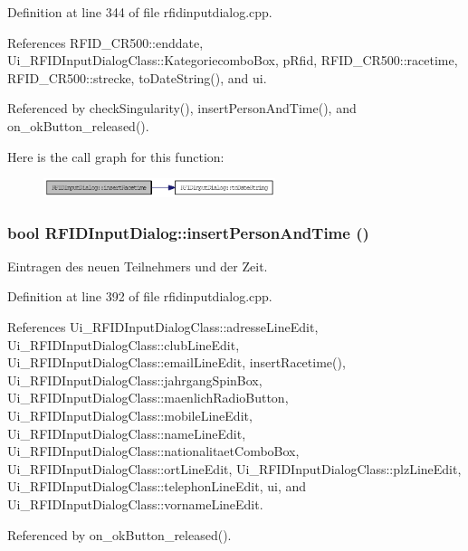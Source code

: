 Definition at line 344 of file rfidinputdialog.cpp.

References RFID\_\-CR500::enddate, Ui\_\-RFIDInputDialogClass::KategoriecomboBox, pRfid, RFID\_\-CR500::racetime, RFID\_\-CR500::strecke, toDateString(), and ui.

Referenced by checkSingularity(), insertPersonAndTime(), and on\_\-okButton\_\-released().

Here is the call graph for this function:\nopagebreak
\begin{figure}[H]
\begin{center}
\leavevmode
\includegraphics[width=192pt]{class_r_f_i_d_input_dialog_3f2a6693dd90d3a2308decf4dcd122dd_cgraph}
\end{center}
\end{figure}
\hypertarget{class_r_f_i_d_input_dialog_5213121582a03ad6c9e78d1915729937}{
\subsubsection[insertPersonAndTime]{\setlength{\rightskip}{0pt plus 5cm}bool RFIDInputDialog::insertPersonAndTime ()}}
\label{class_r_f_i_d_input_dialog_5213121582a03ad6c9e78d1915729937}


Eintragen des neuen Teilnehmers und der Zeit. 



Definition at line 392 of file rfidinputdialog.cpp.

References Ui\_\-RFIDInputDialogClass::adresseLineEdit, Ui\_\-RFIDInputDialogClass::clubLineEdit, Ui\_\-RFIDInputDialogClass::emailLineEdit, insertRacetime(), Ui\_\-RFIDInputDialogClass::jahrgangSpinBox, Ui\_\-RFIDInputDialogClass::maenlichRadioButton, Ui\_\-RFIDInputDialogClass::mobileLineEdit, Ui\_\-RFIDInputDialogClass::nameLineEdit, Ui\_\-RFIDInputDialogClass::nationalitaetComboBox, Ui\_\-RFIDInputDialogClass::ortLineEdit, Ui\_\-RFIDInputDialogClass::plzLineEdit, Ui\_\-RFIDInputDialogClass::telephonLineEdit, ui, and Ui\_\-RFIDInputDialogClass::vornameLineEdit.

Referenced by on\_\-okButton\_\-released().

